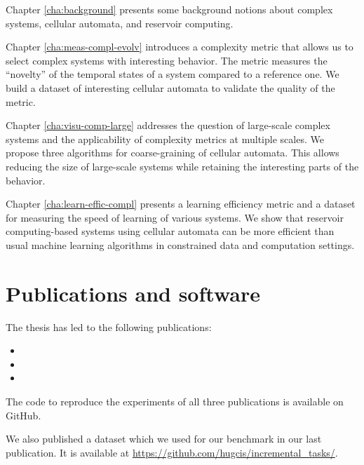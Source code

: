 Chapter \ref{cha:background} presents some background notions about complex
systems, cellular automata, and reservoir computing.

Chapter \ref{cha:meas-compl-evolv} introduces a complexity metric that allows us 
to select complex systems with interesting behavior. The metric measures the
``novelty'' of the temporal states of a system compared to a reference one. We
build a dataset of interesting cellular automata to validate the quality of the
metric.

Chapter \ref{cha:visu-comp-large} addresses the question of large-scale complex
systems and the applicability of complexity metrics at multiple scales. We
propose three algorithms for coarse-graining of cellular automata. This allows
reducing the size of large-scale systems while retaining the interesting parts
of the behavior.

Chapter \ref{cha:learn-effic-compl} presents a learning efficiency metric and a
dataset for measuring the speed of learning of various systems. We show that
reservoir computing-based systems using cellular automata can be more efficient
than usual machine learning algorithms in constrained data and computation
settings.


\section{Publications and software}

The thesis has led to the following publications:

\begin{itemize}
  \item {}
  \item {}
  \item {}
\end{itemize}

The code to reproduce the experiments of all three publications is available on
GitHub.

We also published a dataset which we used for our benchmark in our last
publication. It is available at
\url{https://github.com/hugcis/incremental_tasks/}.
